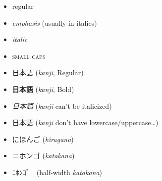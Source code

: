 
\begin{itemize}  
	\item regular
	\item \emph{emphasis} (usually in italics)
	\item \textit{italic}
	\item \textsc{small caps}
	\item 日本語 (\emph{kanji}, Regular)
	\item \textbf{日本語} (\emph{kanji}, Bold)
	\item \textit{日本語} (\emph{kanji} can't be italicized)
	\item \textsc{日本語} (\emph{kanji} don't have lowercase/uppercase\dots)
	\item にほんご (\emph{hiragana})
	\item ニホンゴ (\emph{katakana})
	\item ﾆﾎﾝｺﾞ　(half-width \emph{katakana})
\end{itemize}
